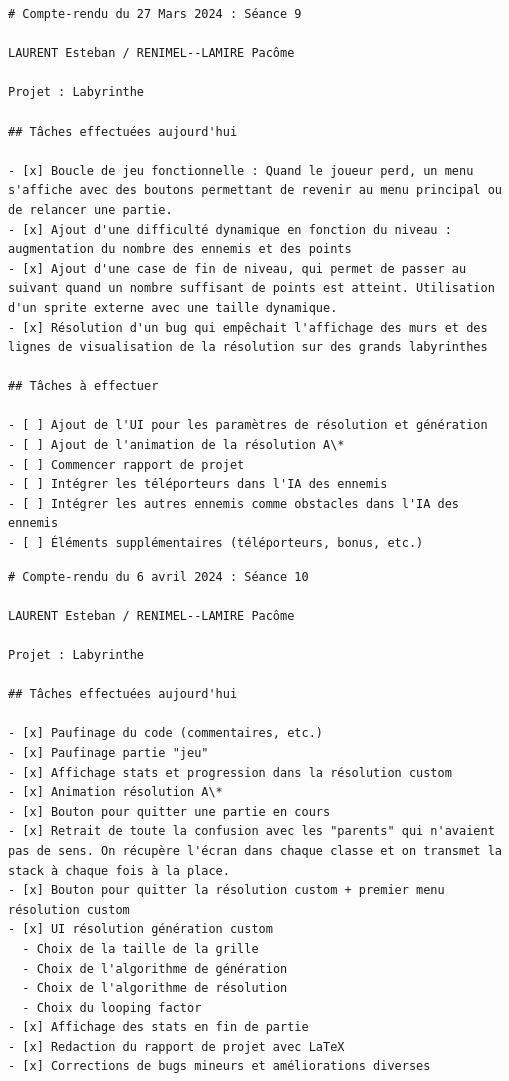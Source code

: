 \documentclass[12pt]{scrreprt} %
\begin{document}
\begin{verbatim}
# Compte-rendu du 27 Mars 2024 : Séance 9

LAURENT Esteban / RENIMEL--LAMIRE Pacôme

Projet : Labyrinthe

## Tâches effectuées aujourd'hui

- [x] Boucle de jeu fonctionnelle : Quand le joueur perd, un menu s'affiche avec des boutons permettant de revenir au menu principal ou de relancer une partie.
- [x] Ajout d'une difficulté dynamique en fonction du niveau : augmentation du nombre des ennemis et des points
- [x] Ajout d'une case de fin de niveau, qui permet de passer au suivant quand un nombre suffisant de points est atteint. Utilisation d'un sprite externe avec une taille dynamique.
- [x] Résolution d'un bug qui empêchait l'affichage des murs et des lignes de visualisation de la résolution sur des grands labyrinthes

## Tâches à effectuer

- [ ] Ajout de l'UI pour les paramètres de résolution et génération
- [ ] Ajout de l'animation de la résolution A\*
- [ ] Commencer rapport de projet
- [ ] Intégrer les téléporteurs dans l'IA des ennemis
- [ ] Intégrer les autres ennemis comme obstacles dans l'IA des ennemis
- [ ] Éléments supplémentaires (téléporteurs, bonus, etc.)

\end{verbatim}

\begin{verbatim}
# Compte-rendu du 6 avril 2024 : Séance 10

LAURENT Esteban / RENIMEL--LAMIRE Pacôme

Projet : Labyrinthe

## Tâches effectuées aujourd'hui

- [x] Paufinage du code (commentaires, etc.)
- [x] Paufinage partie "jeu"
- [x] Affichage stats et progression dans la résolution custom
- [x] Animation résolution A\*
- [x] Bouton pour quitter une partie en cours
- [x] Retrait de toute la confusion avec les "parents" qui n'avaient pas de sens. On récupère l'écran dans chaque classe et on transmet la stack à chaque fois à la place.
- [x] Bouton pour quitter la résolution custom + premier menu résolution custom
- [x] UI résolution génération custom
  - Choix de la taille de la grille
  - Choix de l'algorithme de génération
  - Choix de l'algorithme de résolution
  - Choix du looping factor
- [x] Affichage des stats en fin de partie
- [x] Redaction du rapport de projet avec LaTeX
- [x] Corrections de bugs mineurs et améliorations diverses

\end{verbatim}
\end{document}

